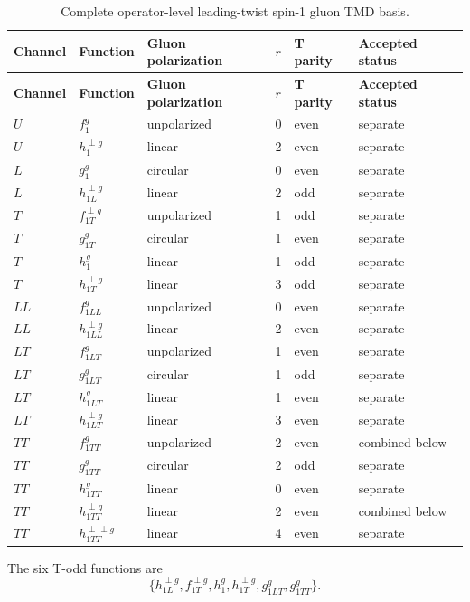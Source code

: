 \documentclass[11pt,oneside]{book}
\begin{document}
\begin{longtable}{llllll}
\caption{Complete operator-level leading-twist spin-1 gluon TMD basis.}\label{tab:gluon-inventory}\\
\toprule
\textbf{Channel}&\textbf{Function}&\textbf{Gluon polarization}&$r$&\textbf{T parity}&\textbf{Accepted status}\\
\midrule
\endfirsthead
\toprule
\textbf{Channel}&\textbf{Function}&\textbf{Gluon polarization}&$r$&\textbf{T parity}&\textbf{Accepted status}\\
\midrule
\endhead
$U$  &$f_1^g$                         &unpolarized&0&even&separate\\
$U$  &$h_1^{\perp g}$                 &linear&2&even&separate\\
$L$  &$g_1^g$                         &circular&0&even&separate\\
$L$  &$h_{1L}^{\perp g}$              &linear&2&odd&separate\\
$T$  &$f_{1T}^{\perp g}$              &unpolarized&1&odd&separate\\
$T$  &$g_{1T}^g$                      &circular&1&even&separate\\
$T$  &$h_1^g$                         &linear&1&odd&separate\\
$T$  &$h_{1T}^{\perp g}$              &linear&3&odd&separate\\
$LL$ &$f_{1LL}^g$                     &unpolarized&0&even&separate\\
$LL$ &$h_{1LL}^{\perp g}$             &linear&2&even&separate\\
$LT$ &$f_{1LT}^g$                     &unpolarized&1&even&separate\\
$LT$ &$g_{1LT}^g$                     &circular&1&odd&separate\\
$LT$ &$h_{1LT}^g$                     &linear&1&even&separate\\
$LT$ &$h_{1LT}^{\perp g}$             &linear&3&even&separate\\
$TT$ &$f_{1TT}^g$                     &unpolarized&2&even&combined below\\
$TT$ &$g_{1TT}^g$                     &circular&2&odd&separate\\
$TT$ &$h_{1TT}^g$                     &linear&0&even&separate\\
$TT$ &$h_{1TT}^{\perp g}$             &linear&2&even&combined below\\
$TT$ &$h_{1TT}^{\perp\perp g}$       &linear&4&even&separate\\
\bottomrule
\end{longtable}
The six T-odd functions are
\begin{equation}
 \{h_{1L}^{\perp g},f_{1T}^{\perp g},h_1^g,h_{1T}^{\perp g},
 g_{1LT}^g,g_{1TT}^g\}.
 \label{eq:gluon-todd-set}
\end{equation}
\end{document}
